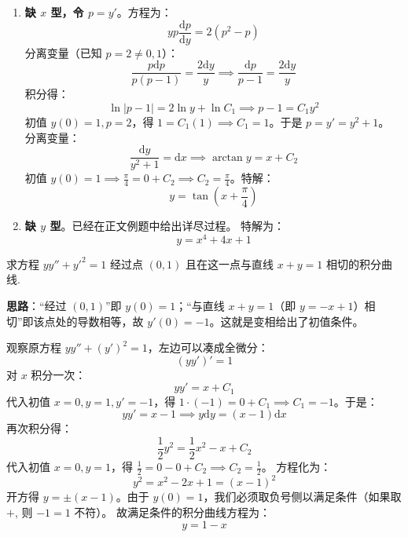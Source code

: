 \documentclass[lang=cn,11pt]{elegantbook}
\begin{document}
\begin{solution}
\begin{enumerate}
    \item[(5)] \textbf{缺 $x$ 型，令 $p=y'$}。方程为：
    \[
    yp\frac{\mathrm{d}p}{\mathrm{d}y} = 2(p^2-p)
    \]
    分离变量（已知 $p=2 \neq 0,1$）：
    \[
    \frac{p\mathrm{d}p}{p(p-1)} = \frac{2\mathrm{d}y}{y} \implies \frac{\mathrm{d}p}{p-1} = \frac{2\mathrm{d}y}{y}
    \]
    积分得：
    \[
    \ln|p-1| = 2\ln y + \ln C_1 \implies p-1 = C_1 y^2
    \]
    初值 $y(0)=1, p=2$，得 $1 = C_1(1) \implies C_1=1$。于是 $p = y' = y^2 + 1$。
    分离变量：
    \[
    \frac{\mathrm{d}y}{y^2+1} = \mathrm{d}x \implies \arctan y = x + C_2
    \]
    初值 $y(0)=1 \implies \frac{\pi}{4} = 0 + C_2 \implies C_2=\frac{\pi}{4}$。特解：
    \[
    \boxed{y = \tan\left(x + \frac{\pi}{4}\right)}
    \]
    
    \item[(6)] \textbf{缺 $y$ 型}。已经在正文例题中给出详尽过程。
    特解为：
    \[
    \boxed{y = x^4 + 4x + 1}
    \]
\end{enumerate}
\end{solution}


\begin{exercise}[二阶方程的初值问题]
求方程 $yy'' + y'^2 = 1$ 经过点 $(0,1)$ 且在这一点与直线 $x+y=1$ 相切的积分曲线.
\end{exercise}
\begin{solution}
\textbf{思路}：“经过 $(0,1)$”即 $y(0)=1$；“与直线 $x+y=1$（即 $y=-x+1$）相切”即该点处的导数相等，故 $y'(0)=-1$。这就是变相给出了初值条件。

观察原方程 $yy'' + (y')^2 = 1$，左边可以凑成全微分：
\[
(yy')' = 1
\]
对 $x$ 积分一次：
\[
yy' = x + C_1
\]
代入初值 $x=0, y=1, y'=-1$，得 $1 \cdot (-1) = 0 + C_1 \implies C_1 = -1$。于是：
\[
yy' = x - 1 \implies y\mathrm{d}y = (x-1)\mathrm{d}x
\]
再次积分得：
\[
\frac{1}{2}y^2 = \frac{1}{2}x^2 - x + C_2
\]
代入初值 $x=0, y=1$，得 $\frac{1}{2} = 0 - 0 + C_2 \implies C_2 = \frac{1}{2}$。
方程化为：
\[
y^2 = x^2 - 2x + 1 = (x-1)^2
\]
开方得 $y = \pm(x-1)$。由于 $y(0)=1$，我们必须取负号侧以满足条件（如果取 $+$, 则 $-1=1$ 不符）。
故满足条件的积分曲线方程为：
\[
\boxed{y = 1-x}
\]
\end{solution}
\end{document}
